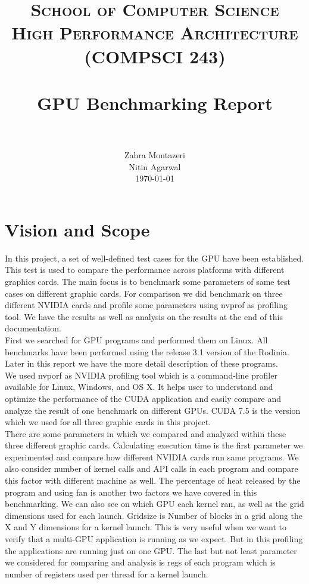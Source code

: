 \documentclass[paper=a4, fontsize=11pt]{scrartcl}
\title{
		\usefont{OT1}{bch}{b}{n}
		\normalfont \normalsize \textsc{School of Computer Science} \\ 
        \normalsize \textsc{High Performance Architecture (COMPSCI 243)} \\
        [25pt]
		\horrule{0.5pt} \\[0.4cm]
		\huge GPU Benchmarking Report \\
		\horrule{2pt} \\[0.5cm]
}
\author{
		\normalfont 								
        \normalsize
        Zahra Montazeri \\[-3pt]		
        \normalsize 
        \newline
        \normalsize
        Nitin Agarwal \\[-3pt]		
        \normalsize 
        \newline
        \newline
        \today
}
\date{}
\numberwithin{equation}{section}		%
\numberwithin{figure}{section}			%
\numberwithin{table}{section}				%
\begin{document}
\maketitle
\newpage
\tableofcontents
\newpage
\section{Vision and Scope}
In this project, a set of well-defined test cases for the GPU have been established. This test is used to compare the performance across platforms with different graphics cards. The main focus is to benchmark some parameters of same test cases on different graphic cards. For comparison we did benchmark on three different NVIDIA cards and profile some parameters using nvprof as profiling tool. We have the results as well as analysis on the results at the end of this documentation.\\
First we searched for GPU programs and performed them on Linux. All benchmarks have been performed using the release 3.1 version of the Rodinia. Later in this report we have the more detail description of these programs.\\
We used nvporf as NVIDIA profiling tool which is a command-line profiler available for Linux, Windows, and OS X. It helps user to understand and optimize the performance of the CUDA application and easily compare and analyze the result of one benchmark on different GPUs.
CUDA 7.5 is the version which we used for all three graphic cards in this project.\\
There are some parameters in which we compared and analyzed within these three  different graphic cards. Calculating execution time is the first parameter we experimented and compare how different NVIDIA cards run same programs. We also consider number of kernel calls and API calls in each program and compare this factor with different machine as well. The percentage of heat released by the program and using fan is another two factors we have covered in this benchmarking. We can also see on which GPU each kernel ran, as well as the grid dimensions used for each launch. Gridsize is Number of blocks in a grid along the X and Y dimensions for a kernel launch. This is very useful when we want to verify that a multi-GPU application is running as we expect. But in this profiling the applications are running just on one GPU. The last but not least parameter we considered for comparing and analysis is regs of each program which is number of registers used per thread for a kernel launch.\\
\end{document}
